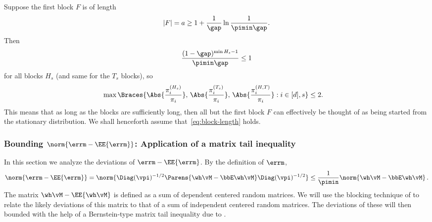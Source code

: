Suppose the first block $F$ is of length
\begin{equation}
  \label{eq:block-length}
  |F| = a \geq 1 + \frac{1}{\gap} \ln \frac1{\pimin\gap}
  .
\end{equation}
Then
\[
  \frac{(1-\gap)^{\min H_s - 1}}{\pimin\gap}
  \leq 1
\]
for all blocks $H_s$ (and same for the $T_s$ blocks), so
\begin{align}
  \max \Braces{
    \Abs{ \frac{\pi_i^{(H_s)}}{\pi_i} } ,\,
    \Abs{ \frac{\pi_i^{(T_s)}}{\pi_i} } ,\,
    \Abs{ \frac{\pi_i^{(H,T)}}{\pi_i} }
    : i \in [d] , s
  }
  & \leq 2
  .
  \label{eq:near-stationary}
\end{align}
This means that as long as the blocks are sufficiently long, then all
but the first block $F$ can effectively be thought of as being started
from the stationary distribution.
We shall henceforth assume that~\eqref{eq:block-length} holds.
\fi
\subsubsection{
Bounding $\norm{\errm-\EE{\errm}}$: 
Application of a matrix tail inequality}
\label{sec:pairwise-tailbound}

In this section we analyze the deviations of $\errm-\EE{\errm}$. By the definition of $\errm$,
\begin{align}
\label{eq:errmdev1}
\norm{\errm-\EE{\errm}}
 =  \norm{\Diag(\vpi)^{-1/2}\Parens{\wh\vM - \bbE \wh\vM } \Diag(\vpi)^{-1/2}}
 \le \frac{1}{\pimin} \norm{\wh\vM - \bbE \wh\vM }
 \,.
\end{align}
The matrix $\wh\vM - \EE{\wh\vM}$  is defined 
as a sum of dependent centered random matrices.
We will use the blocking technique of  \citet{Bernstein27} 
to relate the likely deviations of this matrix to that of
a sum of independent centered random matrices.
The deviations of these will then bounded
with the help of a Bernstein-type matrix tail inequality due to \citet{tropp2015intro}.



